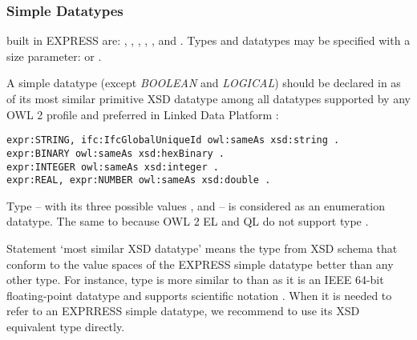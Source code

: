\subsubsection{Simple Datatypes} built in EXPRESS are: , , , , ,  and . Types  and  data\-types may be specified with a size parameter:  or .

\begin{principle}%
A simple data\-type (except \emph{BOOLEAN} and \emph{LOGICAL}) should be declared in \ifcowl{} as  of its most similar primitive XSD data\-type among all data\-types supported by any OWL 2 profile \cite{w3c:owl2-profiles} and preferred in Linked Data Platform \cite{w3c:ldp-best-practices}:

\begin{lstlisting}
expr:STRING, ifc:IfcGlobalUniqueId owl:sameAs xsd:string .
expr:BINARY owl:sameAs xsd:hexBinary .
expr:INTEGER owl:sameAs xsd:integer .
expr:REAL, expr:NUMBER owl:sameAs xsd:double .
\end{lstlisting}
\end{principle}

Type  -- with its three possible values ,  and  -- is considered as an enumeration data\-type. The same to  because OWL 2 EL and QL do not support type  \cite{w3c:owl2-profiles}.

Statement `most similar XSD data\-type' means the type from XSD schema that conform to the value spaces of the EXPRESS simple data\-type better than any other type. For instance, type  is more similar to  than  as it is an IEEE 64-bit floating-point data\-type and supports scientific notation \cite{w3c:xsd,datapic:xsd}. When it is needed to refer to an EXPRRESS simple data\-type, we recommend to use its XSD equivalent type directly.

